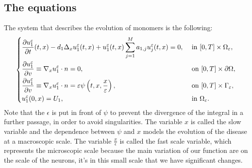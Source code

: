 \subsection{The equations}
The system that describes the evolution of monomers is the following:
\begin{equation}
    \begin{dcases}
    \frac{\partial u_{1}^{\epsilon}}{\partial t}(t, x)-d_{1} \Delta_{x} u_{1}^{\epsilon}(t, x)+u_{1}^{\epsilon}(t, x) \sum_{j=1}^{M} a_{1, j} u_{j}^{\epsilon}(t, x)=0, & \text { in }[0, T] \times \Omega_{\epsilon},\\
    \frac{\partial u^{\epsilon}_1}{\partial v} \equiv \nabla_{x} u^{\epsilon}_1\cdot n=0, & \text { on }[0, T]\times\partial\Omega,\\
    \frac{\partial u^{\epsilon}_{1}}{\partial v} \equiv \nabla_{x} u^{\epsilon}_1 \cdot n=\epsilon \psi\left(t, x,\frac{x}{\epsilon}\right), & \text { on }[0, T] \times \Gamma_{\epsilon},\\
    u_{1}^{\epsilon}(0, x)=U_{1}, & \text{ in }\Omega_{\epsilon}.
    \end{dcases}
\label{eq:u_1_eqs}\end{equation}
Note that the $\epsilon$ is put in front of $\psi$ to prevent the divergence of the integral in a further passage, in order to avoid singularities. 
The variable $x$ is called the slow variable and the dependence between $\psi$ and $x$ models the evolution of the disease at a macroscopic scale. The variable
$\frac{x}{\epsilon}$ is called the fast scale variable, which represents the microscopic scale because the main variation of our function are on the scale of the neurons, it's in this small scale that we have significant changes.

